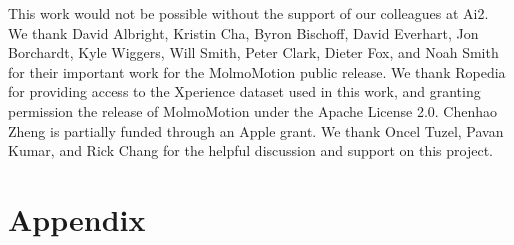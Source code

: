 \documentclass{llmxive}
\providecommand{\modelname}{MolmoMotion\xspace}
\begin{document}
This work would not be possible without the support of our colleagues at Ai2. We thank David Albright, Kristin Cha,  Byron Bischoff, David Everhart, Jon Borchardt, Kyle Wiggers, Will Smith, Peter Clark, Dieter Fox, and Noah Smith for their important work for the \modelname public release. We thank Ropedia for providing access to the Xperience dataset used in this work, and granting permission the release of MolmoMotion under the Apache License 2.0. Chenhao Zheng is partially funded through an Apple grant. We thank Oncel Tuzel, Pavan Kumar, and Rick Chang for the helpful discussion and support on this project.







\appendix
\section*{Appendix}
\begingroup
\hypersetup{hidelinks}
\end{document}

